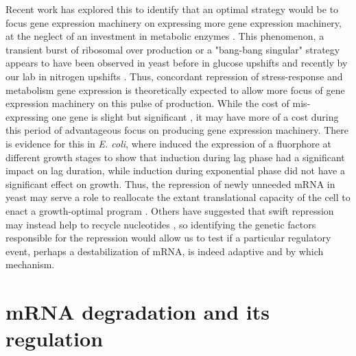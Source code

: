 Recent work has explored this to identify that an optimal strategy
would be to focus gene expression machinery on expressing more gene 
expression machinery, at the neglect of an investment in metabolic
enzymes \parencite{giordano2016dynamical}. 
This phenomenon, a transient burst of ribosomal over production or a
"bang-bang singular" strategy appears to have been observed in
yeast before in glucose upshifts \parencite{griffioen1996ribosomal} 
and recently by our lab in nitrogen upshifts 
\parencite{arioldi2016steady}.
Thus, concordant repression of stress-response and
metabolism gene expression is theoretically expected to allow more
focus of gene expression machinery on this pulse of production.
While the cost of mis-expressing one gene is slight but significant
\parencite{kafri2016cost}, it may have more of a cost during this
period of advantageous focus on producing gene expression machinery.
There is evidence for this in \textit{E. coli}, where
\cite{shachrai2010cost} induced the expression of a fluorphore at
different growth stages to show that induction during lag phase 
had a significant impact on lag duration, while induction during
exponential phase did not have a significant effect on growth.
Thus, the repression of newly unneeded mRNA in yeast may serve a 
role to reallocate the extant translational
capacity of the cell to enact a growth-optimal program 
\parencite{kief1981coordinate}. 
Others have suggested that swift repression may instead
help to recycle nucleotides \parencite{kresnowati2006transcriptome},
so identifying the genetic factors responsible for the repression 
would allow us to test if a particular regulatory event,
perhaps a destabilization of mRNA, is indeed adaptive and by which
mechanism.

\section{mRNA degradation and its regulation}

